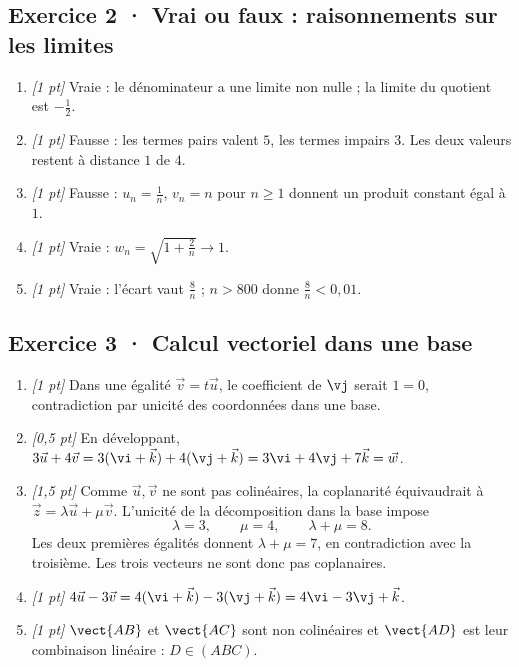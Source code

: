 \subsection*{Exercice 2 · Vrai ou faux : raisonnements sur les limites}\begin{enumerate}

\item \textit{[1 pt]} Vraie : le dénominateur a une limite non nulle ; la limite du quotient est $-\frac{1}{2}$.

\item \textit{[1 pt]} Fausse : les termes pairs valent $5$, les termes impairs $3$. Les deux valeurs restent à distance $1$ de $4$.

\item \textit{[1 pt]} Fausse : $u_n=\frac{1}{n}$, $v_n=n$ pour $n\ge1$ donnent un produit constant égal à $1$.

\item \textit{[1 pt]} Vraie : $w_n=\sqrt{1+\frac{2}{n}}\to1$.

\item \textit{[1 pt]} Vraie : l'écart vaut $\frac{8}{n}$ ; $n>800$ donne $\frac{8}{n}<0{,}01$.

\end{enumerate}

\subsection*{Exercice 3 · Calcul vectoriel dans une base}\begin{enumerate}

\item \textit{[1 pt]} Dans une égalité $\vec v=t\vec u$, le coefficient de $\vj $ serait $1=0$, contradiction par unicité des coordonnées dans une base.

\item \textit{[0,5 pt]} En développant, $3\vec u+4\vec v=3(\vi +\vec k)+4(\vj +\vec k)=3\vi +4\vj +7\vec k=\vec w$.

\item \textit{[1,5 pt]} Comme $\vec u,\vec v$ ne sont pas colinéaires, la coplanarité équivaudrait à $\vec z=\lambda\vec u+\mu\vec v$. L'unicité de la décomposition dans la base impose
\[\lambda=3,\qquad\mu=4,\qquad\lambda+\mu=8.\]
Les deux premières égalités donnent $\lambda+\mu=7$, en contradiction avec la troisième. Les trois vecteurs ne sont donc pas coplanaires.

\item \textit{[1 pt]} $4\vec u-3\vec v=4(\vi +\vec k)-3(\vj +\vec k)=4\vi -3\vj +\vec k$.

\item \textit{[1 pt]} $\vect{AB}$ et $\vect{AC}$ sont non colinéaires et $\vect{AD}$ est leur combinaison linéaire : $D\in(ABC)$.

\end{enumerate}

